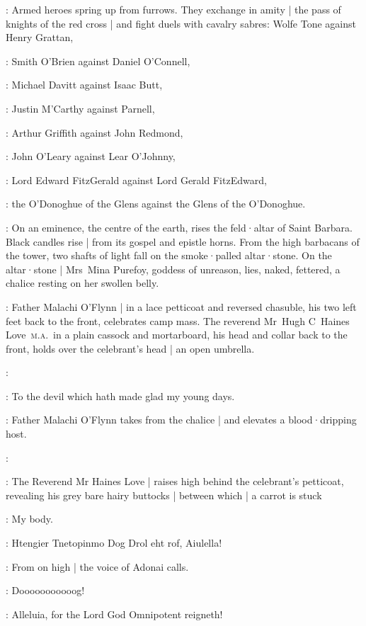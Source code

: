 :
Armed heroes spring up from furrows.
They exchange in amity |
the pass of knights of the red cross |
and fight duels with cavalry sabres:
Wolfe Tone against Henry Grattan,

:
Smith O'Brien against Daniel O'Connell,

:
Michael Davitt against Isaac Butt,

:
Justin M'Carthy against Parnell,

:
Arthur Griffith against John Redmond,

:
John O'Leary against Lear O'Johnny,

:
Lord Edward FitzGerald against Lord Gerald FitzEdward,

:
the O'Donoghue of the Glens against the Glens of the O'Donoghue.

:
On an eminence,
the centre of the earth,
rises the feld·altar of Saint Barbara.
Black candles rise |
from its gospel and epistle horns.
%
From the high barbacans of the tower,
two shafts of light fall on the smoke·palled altar·stone.
On the altar·stone |
Mrs~Mina Purefoy,
goddess of unreason,
lies,
naked,
fettered,
a chalice resting on her swollen belly.

:
Father Malachi O'Flynn |
in a lace petticoat and reversed chasuble,
his two left feet back to the front,
celebrates camp mass.
The reverend Mr~Hugh C~Haines Love~\textsc{m.a.}\ 
in a plain cassock and mortarboard,
his head and collar back to the front,
holds over the celebrant's head |
an open umbrella.

\FrMalachiOFlynn[1]:

\HainesLove[2]:
To the devil which hath made glad my young days.

:
Father Malachi O'Flynn takes from the chalice |
and elevates a blood·dripping host.

\FrMalachiOFlynn:

:
The Reverend Mr Haines Love |
raises high behind the celebrant's petticoat,
revealing his grey bare hairy buttocks |
between which |
a carrot is stuck

\HainesLove:
My body.

\VoiceAllDamned[2]:
Htengier Tnetopinmo Dog Drol eht rof,
Aiulella!

:
From on high |
the voice of Adonai calls.

\Adonai:
Dooooooooooog!

\VoiceAllBlessed[1]:
Alleluia,
for the Lord God Omnipotent reigneth!

